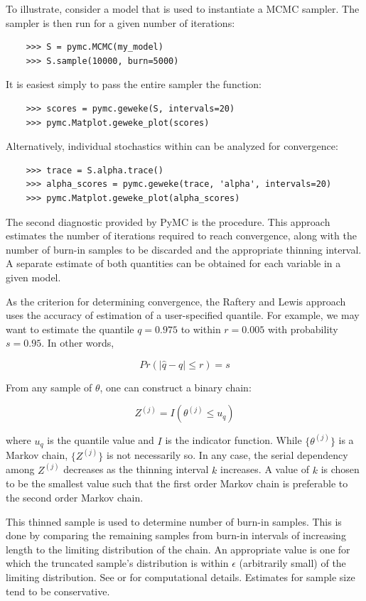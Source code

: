 To illustrate, consider a model  that is used to instantiate a MCMC sampler. The sampler is then run for a given number of iterations:
\begin{verbatim}
	>>> S = pymc.MCMC(my_model)
	>>> S.sample(10000, burn=5000)
\end{verbatim}
It is easiest simply to pass the entire sampler  the  function:
\begin{verbatim}
	>>> scores = pymc.geweke(S, intervals=20)
	>>> pymc.Matplot.geweke_plot(scores)
\end{verbatim}
Alternatively, individual stochastics within  can be analyzed for convergence:
\begin{verbatim}
	>>> trace = S.alpha.trace()
	>>> alpha_scores = pymc.geweke(trace, 'alpha', intervals=20)
	>>> pymc.Matplot.geweke_plot(alpha_scores)
\end{verbatim}

The second diagnostic provided by PyMC is the \citet{raftery} procedure. This approach estimates the number of iterations required to reach convergence, along with the number of burn-in samples to be discarded and the appropriate thinning interval. A separate estimate of both quantities can be obtained for each variable in a given model.

As the criterion for determining convergence, the Raftery and Lewis approach uses the accuracy of estimation of a user-specified quantile. For example, we may want to estimate the quantile $q=0.975$ to within $r=0.005$ with probability $s=0.95$. In other words,

\begin{equation}
	Pr(|\hat{q}-q| \le r) = s
\end{equation}

From any sample of $\theta$, one can construct a binary chain:

\begin{equation}
	Z^{(j)} = I(\theta^{(j)} \le u_q)
\end{equation}

where $u_q$ is the quantile value and $I$ is the indicator function. While $\{\theta^{(j)}\}$ is a Markov chain, $\{Z^{(j)}\}$ is not necessarily so. In any case, the serial dependency among $Z^{(j)}$ decreases as the thinning interval $k$ increases. A value of $k$ is chosen to be the smallest value such that the first order Markov chain is preferable to the second order Markov chain.

This thinned sample is used to determine number of burn-in samples. This is done by comparing the remaining samples from burn-in intervals of increasing length to the limiting distribution of the chain. An appropriate value is one for which the truncated sample's distribution is within $\epsilon$ (arbitrarily small) of the limiting distribution. See \citet{raftery} or \citet{Gamerman:1997tb} for computational details. Estimates for sample size tend to be conservative.

